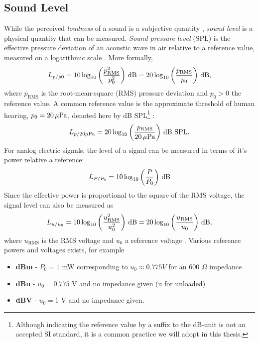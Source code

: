 \documentclass[../main2.tex]{subfiles}
\begin{document}
\subsection{Sound Level}
While the perceived \emph{loudness} of a sound is a subjective quantity \cite{american1973american}, \emph{sound level} is a physical quantity that can be measured. \emph{Sound pressure level} (SPL) is the effective pressure deviation of an acoustic wave in air relative to a reference value, measured on a logarithmic scale \cite{davis1989sound}. More formally,
\begin{equation}
L_{p/p0} = 10 \log_{10} \left( \frac{p_\text{RMS}^2}{p_0^2} \right) \mskip3mu\text{dB} = 20 \log_{10} \left( \frac{p_\text{RMS}}{p_0} \right) \mskip3mu\text{dB},
\end{equation}
where $p_\text{RMS}$ is the root-mean-square (RMS) pressure deviation and $p_0 > 0$ the reference value. A common reference value is the approximate threshold of human hearing, $p_0 = 20 \mskip3mu\mu\text{Pa}$, denoted here by dB SPL\footnote{Although indicating the reference value by a suffix to the dB-unit is not an accepted SI standard, it is a common practice we will adopt in this thesis.} \cite{davis1989sound}:
\begin{equation}
L_{p/20 \mu\text{Pa}} = 20 \log_{10} \left( \frac{p_\text{RMS}}{20 \mskip3mu\mu\text{Pa}} \right) \mskip3mu\text{dB~SPL}.
\end{equation}
For analog electric signals, the level of a signal can be measured in terms of it's power relative a reference:
\begin{equation}
L_{P/P_0} = 10 \log_{10} \left( \frac{P}{P_0} \right) \mskip3mu\text{dB}
\end{equation}
Since the effective power is proportional to the square of the RMS voltage, the signal level can also be measured as
\begin{equation}
L_{u/u_0} = 10 \log_{10} \left( \frac{u_\text{RMS}^2}{u_0^2} \right) \mskip3mu\text{dB} = 20 \log_{10} \left( \frac{u_\text{RMS}}{u_0} \right) \mskip3mu\text{dB},
\end{equation}
where $u_\text{RMS}$ is the RMS voltage and $u_0$ a reference voltage \cite{davis1989sound}. Various reference powers and voltages exists, for example 
\begin{itemize}
\item \textbf{dBm} - $P_0 = 1$ mW corresponding to $u_0 \approx 0.775 V$ for an 600 $\Omega$ impedance
\item \textbf{dBu} - $u_0 = 0.775$ V and no impedance given (u for unloaded)
\item \textbf{dBV} - $u_0 = 1$ V and no impedance given.
\end{itemize}
\end{document}
